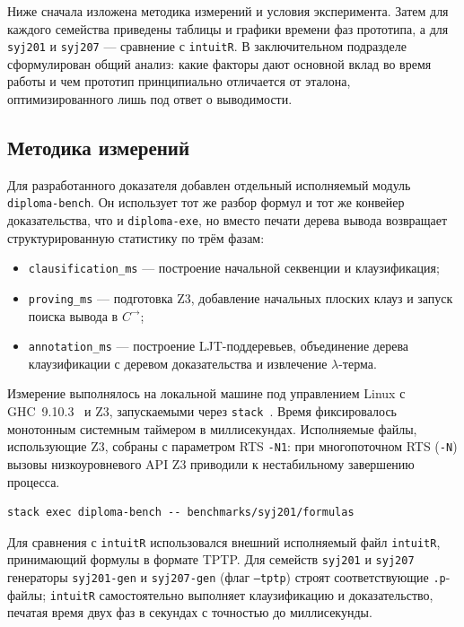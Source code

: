 \documentclass[14pt, russian]{scrartcl}
\begin{document}
Ниже сначала изложена методика измерений и условия эксперимента. Затем для
каждого семейства приведены таблицы и графики времени фаз прототипа, а для
\texttt{syj201} и \texttt{syj207} --- сравнение с \texttt{intuitR}. В
заключительном подразделе сформулирован общий анализ: какие факторы дают
основной вклад во время работы и чем прототип принципиально отличается от
эталона, оптимизированного лишь под ответ о выводимости.

\subsection{Методика измерений}

Для разработанного доказателя добавлен отдельный исполняемый модуль
\texttt{diploma-bench}. Он использует тот же разбор формул и тот же конвейер
доказательства, что и \texttt{diploma-exe}, но вместо печати дерева вывода
возвращает структурированную статистику по трём фазам:
\begin{itemize}
\item \texttt{clausification\_ms} --- построение начальной секвенции и
  клаузификация;
\item \texttt{proving\_ms} --- подготовка Z3, добавление начальных плоских клауз
  и запуск поиска вывода в $C^{\rightarrow}$;
\item \texttt{annotation\_ms} --- построение LJT-поддеревьев, объединение дерева
  клаузификации с деревом доказательства и извлечение $\lambda$-терма.
\end{itemize}

Измерение выполнялось на локальной машине под управлением Linux с
GHC~9.10.3~\cite{GHCUserGuide} и Z3, запускаемыми через \texttt{stack}~\cite{StackDocs}.
Время фиксировалось монотонным системным таймером в миллисекундах. Исполняемые файлы, использующие Z3, собраны
с параметром RTS \texttt{-N1}: при многопоточном RTS (\texttt{-N}) вызовы
низкоуровневого API Z3 приводили к нестабильному завершению процесса.

\begin{listing}[!htb]
\caption{Запуск бенчмарка разработанного доказателя}
\label{lst:benchmark-command}
\begin{verbatim}
stack exec diploma-bench -- benchmarks/syj201/formulas
\end{verbatim}
\end{listing}

Для сравнения с \texttt{intuitR} использовался внешний исполняемый файл
\texttt{intuitR}, принимающий формулы в формате TPTP. Для семейств
\texttt{syj201} и \texttt{syj207} генераторы \texttt{syj201-gen} и
\texttt{syj207-gen} (флаг \texttt{---tptp}) строят соответствующие
\texttt{.p}-файлы; \texttt{intuitR} самостоятельно выполняет клаузификацию и
доказательство, печатая время двух фаз в секундах с точностью до миллисекунды.
\end{document}
